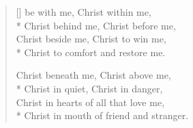 
\newHymn

\begin{verse}[\versewidth]
 be with me, Christ within me,\\*
Christ behind me, Christ before me,\\
Christ beside me, Christ to win me,\\*
Christ to comfort and restore me.

Christ beneath me, Christ above me,\\*
Christ in quiet, Christ in danger,\\
Christ in hearts of all that love me,\\*
Christ in mouth of friend and stranger.

\end{verse}


